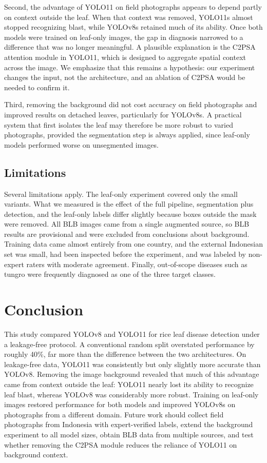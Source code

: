 \documentclass[conference,a4paper]{IEEEtran}
\begin{document}
Second, the advantage of YOLO11 on field photographs appears to depend partly on context outside the leaf. When that context was removed, YOLO11s almost stopped recognizing blast, while YOLOv8s retained much of its ability. Once both models were trained on leaf-only images, the gap in diagnosis narrowed to a difference that was no longer meaningful. A plausible explanation is the C2PSA attention module in YOLO11, which is designed to aggregate spatial context across the image. We emphasize that this remains a hypothesis: our experiment changes the input, not the architecture, and an ablation of C2PSA would be needed to confirm it.

Third, removing the background did not cost accuracy on field photographs and improved results on detached leaves, particularly for YOLOv8s. A practical system that first isolates the leaf may therefore be more robust to varied photographs, provided the segmentation step is always applied, since leaf-only models performed worse on unsegmented images.

\subsection{Limitations}
Several limitations apply. The leaf-only experiment covered only the small variants. What we measured is the effect of the full pipeline, segmentation plus detection, and the leaf-only labels differ slightly because boxes outside the mask were removed. All BLB images came from a single augmented source, so BLB results are provisional and were excluded from conclusions about background. Training data came almost entirely from one country, and the external Indonesian set was small, had been inspected before the experiment, and was labeled by non-expert raters with moderate agreement. Finally, out-of-scope diseases such as tungro were frequently diagnosed as one of the three target classes.

\section{Conclusion}

This study compared YOLOv8 and YOLO11 for rice leaf disease detection under a leakage-free protocol. A conventional random split overstated performance by roughly 40\%, far more than the difference between the two architectures. On leakage-free data, YOLO11 was consistently but only slightly more accurate than YOLOv8. Removing the image background revealed that much of this advantage came from context outside the leaf: YOLO11 nearly lost its ability to recognize leaf blast, whereas YOLOv8 was considerably more robust. Training on leaf-only images restored performance for both models and improved YOLOv8s on photographs from a different domain. Future work should collect field photographs from Indonesia with expert-verified labels, extend the background experiment to all model sizes, obtain BLB data from multiple sources, and test whether removing the C2PSA module reduces the reliance of YOLO11 on background context.
\end{document}
